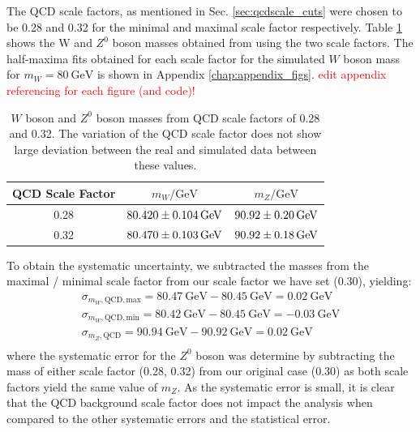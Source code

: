 \documentclass[a4paper]{report}
\numberwithin{equation}{section}
\begin{document}
The QCD scale factors, as mentioned in Sec. \ref{sec:qcdscale_cuts} were chosen to be 0.28 and 0.32 for the minimal and maximal scale 
factor respectively. Table \ref{tab:qcd_syserr} shows the W and $Z^0$ boson masses obtained from using the two scale factors. The half-maxima fits obtained for each 
scale factor for the simulated $W$ boson mass for $m_W = \SI{80}{\giga\electronvolt}$ is shown in Appendix \ref{chap:appendix_figs}. \textcolor{red}{edit appendix 
referencing for each figure (and code)!}

\begin{table}
    \centering
    \begin{tabular}{|c|c|c|} \hline
    QCD Scale Factor &  $m_W / \si{\giga\electronvolt}$ & $m_Z / \si{\giga\electronvolt}$\\ \hline
    0.28 & $\SI{80.42 \pm 0.104}{\giga\electronvolt}$ & $\SI{90.92 \pm 0.20}{\giga\electronvolt}$ \\ 
    0.32 & $\SI{80.47 \pm 0.103}{\giga\electronvolt}$ & $\SI{90.92 \pm 0.18}{\giga\electronvolt}$ \\ \hline
    \end{tabular}
    \caption{$W$ boson and $Z^0$ boson masses from QCD scale factors of 0.28 and 0.32. The variation of the QCD scale factor 
    does not show large deviation between the real and simulated data between these values.}
    \label{tab:qcd_syserr}
\end{table}

To obtain the systematic uncertainty, we subtracted the masses from the maximal / minimal scale factor from our scale 
factor we have set (0.30), yielding:
\begin{align}
    \sigma_{m_W, \mathrm{QCD, max}} = \SI{80.47}{\giga\electronvolt} - \SI{80.45}{\giga\electronvolt} = \SI{0.02}{\giga\electronvolt} \\
    \sigma_{m_W, \mathrm{QCD, min}} = \SI{80.42}{\giga\electronvolt} - \SI{80.45}{\giga\electronvolt} = -\SI{0.03}{\giga\electronvolt} \\
    \sigma_{m_Z, \mathrm{QCD}} = \SI{90.94}{\giga\electronvolt} - \SI{90.92}{\giga\electronvolt} = \SI{0.02}{\giga\electronvolt} \\
\end{align}
where the systematic error for the $Z^0$ boson was determine by subtracting the mass of either scale factor (0.28, 0.32) from our original 
case (0.30) as both scale factors yield the same value of $m_Z$.
As the systematic error is small, it is clear that the QCD background scale factor does not impact the analysis when compared to the other systematic
  errors and the statistical error. 
\end{document}
